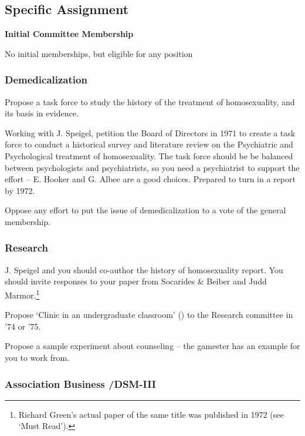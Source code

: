 \begin{refsection}
\subsection{Specific Assignment}
\label{specificassignment}

\textbf{Initial Committee Membership}

No initial memberships, but eligible for any position

\subsubsection{Demedicalization}
\label{demedicalization}

\begin{proposal}[Green]\label{proposal:green}
Propose a task force to study the history of the treatment of homosexuality, and its basis in evidence. \end{proposal}

Working with J. Speigel, petition the Board of Directors in 1971 to create a task force to conduct a historical survey and literature review on the Psychiatric and Psychological treatment of homosexuality. The task force should be be balanced between psychologists and psychiatrists, so you need a psychiatrist to support the effort – E. Hooker and G. Albee are a good choices. Prepared to turn in a report by 1972.

Oppose any effort to put the issue of demedicalization to a vote of the general membership.

\subsubsection{Research}
\label{research}

J. Speigel and you should co-author the history of homosexuality report. You should invite responses to your paper from Socarides \& Beiber and Judd Marmor.\footnote{Richard Green's actual paper of the same title was published in 1972 (see `Must Read').}

\begin{researchtask}[Green]\label{research:green}
Propose ‘Clinic in an undergraduate classroom’ () to the Research committee in ’74 or ’75.
\end{researchtask}

Propose a sample experiment about counseling -- the gamester has an example for you to work from.

\subsubsection{Association Business \slash  DSM-III}
\label{associationbusinessdsm-iii}


\end{refsection}
